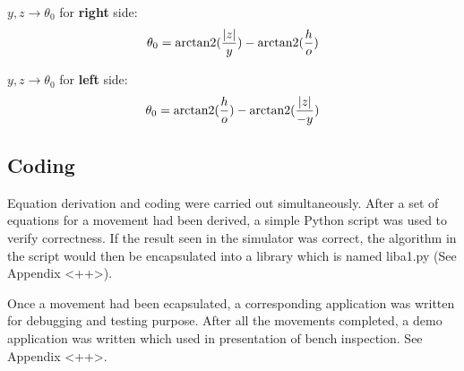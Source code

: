 $y, z \rightarrow \theta_0$ for \textbf{right} side:
\begin{equation}
   \theta_0 = \operatorname{arctan2}(\frac{\lvert z \lvert}{y}) - \operatorname{arctan2}(\frac{h}{o})
\end{equation}

$y, z \rightarrow \theta_0$ for \textbf{left} side:
\begin{equation}
   \theta_0 = \operatorname{arctan2}(\frac{h}{o}) - \operatorname{arctan2}(\frac{\lvert z \lvert}{-y})
\end{equation}

\subsection{Coding}

Equation derivation and coding were carried out simultaneously. After a set of equations for a movement had been derived, a simple Python script was used to verify correctness. If the result seen in the simulator was correct, the algorithm in the script would then be encapsulated into a library which is named liba1.py (See Appendix <++>).

Once a movement had been ecapsulated, a corresponding application was written for debugging and testing purpose. After all the movements completed, a demo application was written which used in presentation of bench inspection. See Appendix <++>.
